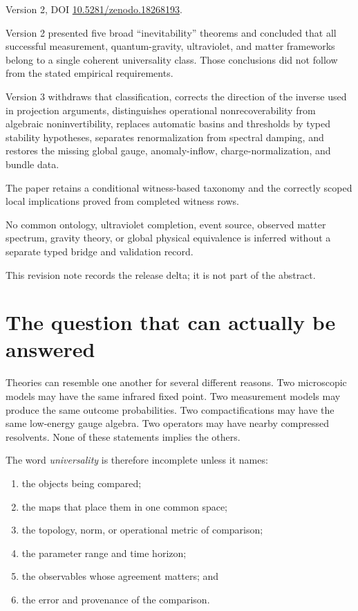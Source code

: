 \documentclass[11pt]{article}
\theoremstyle{definition}
\theoremstyle{remark}
\begin{document}
\begin{description}[leftmargin=3.3cm,style=nextline]
\item[Supersedes.] Version 2, DOI
\href{https://doi.org/10.5281/zenodo.18268193}{10.5281/zenodo.18268193}.
\item[Reason.] Version 2 presented five broad ``inevitability'' theorems and
concluded that all successful measurement, quantum-gravity, ultraviolet, and
matter frameworks belong to a single coherent universality class. Those
conclusions did not follow from the stated empirical requirements.
\item[Resolution.] Version 3 withdraws that classification, corrects the
direction of the inverse used in projection arguments, distinguishes
operational nonrecoverability from algebraic noninvertibility, replaces
automatic basins and thresholds by typed stability hypotheses, separates
renormalization from spectral damping, and restores the missing global gauge,
anomaly-inflow, charge-normalization, and bundle data.
\item[Retained content.] The paper retains a conditional witness-based taxonomy
and the correctly scoped local implications proved from completed witness rows.
\item[Remaining boundary.] No common ontology, ultraviolet completion, event
source, observed matter spectrum, gravity theory, or global physical equivalence
is inferred without a separate typed bridge and validation record.
\end{description}

This revision note records the release delta; it is not part of the abstract.

\tableofcontents

\section{The question that can actually be answered}
\label{sec:orientation}

Theories can resemble one another for several different reasons. Two microscopic
models may have the same infrared fixed point. Two measurement models may
produce the same outcome probabilities. Two compactifications may have the same
low-energy gauge algebra. Two operators may have nearby compressed resolvents.
None of these statements implies the others.

The word \emph{universality} is therefore incomplete unless it names:
\begin{enumerate}[label=(\arabic*)]
  \item the objects being compared;
  \item the maps that place them in one common space;
  \item the topology, norm, or operational metric of comparison;
  \item the parameter range and time horizon;
  \item the observables whose agreement matters; and
  \item the error and provenance of the comparison.
\end{enumerate}
\end{document}
